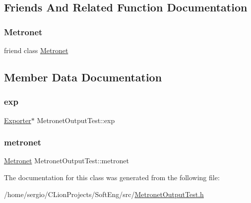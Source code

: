 \subsection{Friends And Related Function Documentation}
\mbox{\label{class_metronet_output_test_a07c94fb69880743e62f64a941fc2d4ab}} 
\subsubsection{\texorpdfstring{Metronet}{Metronet}}
{\footnotesize\ttfamily friend class \hyperlink{class_metronet}{Metronet}\hspace{0.3cm}{\ttfamily [friend]}}



\subsection{Member Data Documentation}
\mbox{\label{class_metronet_output_test_ace0d26029b129b05d3846365c56d42ee}} 
\subsubsection{\texorpdfstring{exp}{exp}}
{\footnotesize\ttfamily \hyperlink{class_exporter}{Exporter}$\ast$ Metronet\+Output\+Test\+::exp\hspace{0.3cm}{\ttfamily [protected]}}

\mbox{\label{class_metronet_output_test_aaa6f34ee762d128cd8aea8c895bb46e4}} 
\subsubsection{\texorpdfstring{metronet}{metronet}}
{\footnotesize\ttfamily \hyperlink{class_metronet}{Metronet} Metronet\+Output\+Test\+::metronet\hspace{0.3cm}{\ttfamily [protected]}}



The documentation for this class was generated from the following file\+:\begin{DoxyCompactItemize}
\item 
/home/sergio/\+C\+Lion\+Projects/\+Soft\+Eng/src/\hyperlink{_metronet_output_test_8h}{Metronet\+Output\+Test.\+h}\end{DoxyCompactItemize}
